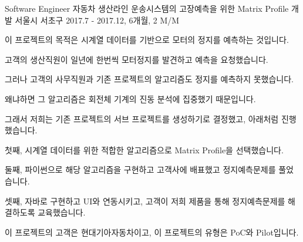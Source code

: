 \begin{cventries}
  \cventry
    {Software Engineer} %
    {자동차 생산라인 운송시스템의 고장예측을 위한 Matrix Profile 개발} %
    {서울시 서초구} %
    {2017.7 - 2017.12, 6개월, 2 M/M} %
    {
      \begin{cvitems} %
        \item {이 프로젝트의 목적은 시계열 데이터를 기반으로 모터의 정지를 예측하는 것입니다.}
        \item {고객의 생산직원이 일년에 한번씩 모터정지를 발견하고 예측을 요청했습니다.}
        \item {그러나 고객의 사무직원과 기존 프로젝트의 알고리즘도 정지를 예측하지 못했습니다.}
        \item {왜냐하면 그 알고리즘은 회전체 기계의 진동 분석에 집중했기 때문입니다.}
        \item {그래서 저희는 기존 프로젝트의 서브 프로젝트를 생성하기로 결정했고, 아래처럼 진행했습니다.}
        \item {첫째, 시계열 데이터를 위한 적합한 알고리즘으로 Matrix Profile을 선택했습니다.}
        \item {둘째, 파이썬으로 해당 알고리즘을 구현하고 고객사에 배표했고 정지예측문제를 풀었습니다.}
        \item {셋째, 자바로 구현하고 UI와 연동시키고, 고객이 저희 제품을 통해 정지예측문제를 해결하도록 교육했습니다.}
        \item {이 프로젝트의 고객은 현대기아자동차이고, 이 프로젝트의 유형은 PoC와 Pilot입니다.}
      \end{cvitems}
    }


\end{cventries}
